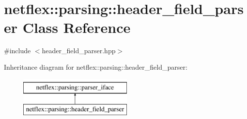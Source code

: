\hypertarget{classnetflex_1_1parsing_1_1header__field__parser}{}\section{netflex\+:\+:parsing\+:\+:header\+\_\+field\+\_\+parser Class Reference}
\label{classnetflex_1_1parsing_1_1header__field__parser}


{\ttfamily \#include $<$header\+\_\+field\+\_\+parser.\+hpp$>$}

Inheritance diagram for netflex\+:\+:parsing\+:\+:header\+\_\+field\+\_\+parser\+:\begin{figure}[H]
\begin{center}
\leavevmode
\includegraphics[height=2.000000cm]{classnetflex_1_1parsing_1_1header__field__parser}
\end{center}
\end{figure}
